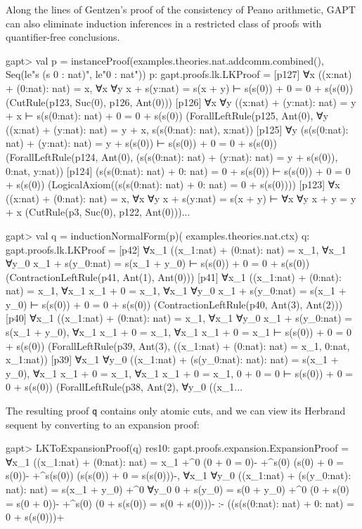 \documentclass[a4paper,11pt]{book}
\begin{document}
Along the lines of Gentzen's proof of the consistency of Peano arithmetic,
GAPT can also eliminate induction inferences in a restricted class of proofs
with quantifier-free conclusions.

\begin{clilisting}
gapt> val p = instanceProof(examples.theories.nat.addcomm.combined(),                                     Seq(le"s (s 0 : nat)", le"0 : nat"))
p: gapt.proofs.lk.LKProof =
[p127] ∀x ((x:nat) + (0:nat): nat) = x,
∀x ∀y x + s(y:nat) = s(x + y)
⊢
s(s(0)) + 0 = 0 + s(s(0))    (CutRule(p123, Suc(0), p126, Ant(0)))
[p126] ∀x ∀y ((x:nat) + (y:nat): nat) = y + x ⊢ s(s(0:nat): nat) + 0 = 0 + s(s(0))    (ForallLeftRule(p125, Ant(0), ∀y ((x:nat) + (y:nat): nat) = y + x, s(s(0:nat): nat), x:nat))
[p125] ∀y (s(s(0:nat): nat) + (y:nat): nat) = y + s(s(0)) ⊢ s(s(0)) + 0 = 0 + s(s(0))    (ForallLeftRule(p124, Ant(0), (s(s(0:nat): nat) + (y:nat): nat) = y + s(s(0)), 0:nat, y:nat))
[p124] (s(s(0:nat): nat) + 0: nat) = 0 + s(s(0)) ⊢ s(s(0)) + 0 = 0 + s(s(0))    (LogicalAxiom((s(s(0:nat): nat) + 0: nat) = 0 + s(s(0))))
[p123] ∀x ((x:nat) + (0:nat): nat) = x,
∀x ∀y x + s(y:nat) = s(x + y)
⊢
∀x ∀y x + y = y + x    (CutRule(p3, Suc(0), p122, Ant(0)))...

gapt> val q = inductionNormalForm(p)(                                         examples.theories.nat.ctx)
q: gapt.proofs.lk.LKProof =
[p42] ∀x_1 ((x_1:nat) + (0:nat): nat) = x_1,
∀x_1 ∀y_0 x_1 + s(y_0:nat) = s(x_1 + y_0)
⊢
s(s(0)) + 0 = 0 + s(s(0))    (ContractionLeftRule(p41, Ant(1), Ant(0)))
[p41] ∀x_1 ((x_1:nat) + (0:nat): nat) = x_1,
∀x_1 x_1 + 0 = x_1,
∀x_1 ∀y_0 x_1 + s(y_0:nat) = s(x_1 + y_0)
⊢
s(s(0)) + 0 = 0 + s(s(0))    (ContractionLeftRule(p40, Ant(3), Ant(2)))
[p40] ∀x_1 ((x_1:nat) + (0:nat): nat) = x_1,
∀x_1 ∀y_0 x_1 + s(y_0:nat) = s(x_1 + y_0),
∀x_1 x_1 + 0 = x_1,
∀x_1 x_1 + 0 = x_1
⊢
s(s(0)) + 0 = 0 + s(s(0))    (ForallLeftRule(p39, Ant(3), ((x_1:nat) + (0:nat): nat) = x_1, 0:nat, x_1:nat))
[p39] ∀x_1 ∀y_0 ((x_1:nat) + (s(y_0:nat): nat): nat) = s(x_1 + y_0),
∀x_1 x_1 + 0 = x_1,
∀x_1 x_1 + 0 = x_1,
0 + 0 = 0
⊢
s(s(0)) + 0 = 0 + s(s(0))    (ForallLeftRule(p38, Ant(2), ∀y_0 ((x_1...

\end{clilisting}

The resulting proof \texttt{q} contains only atomic cuts, and we can view its Herbrand
sequent by converting to an expansion proof:

\begin{clilisting}
gapt> LKToExpansionProof(q)
res10: gapt.proofs.expansion.ExpansionProof =
∀x_1 ((x_1:nat) + (0:nat): nat) = x_1
  +^{0} (0 + 0 = 0)-
  +^{s(0)} (s(0) + 0 = s(0))-
  +^{s(s(0))} (s(s(0)) + 0 = s(s(0)))-,
∀x_1 ∀y_0 ((x_1:nat) + (s(y_0:nat): nat): nat) = s(x_1 + y_0)
  +^{0}
    ∀y_0 0 + s(y_0) = s(0 + y_0)
    +^{0} (0 + s(0) = s(0 + 0))-
    +^{s(0)} (0 + s(s(0)) = s(0 + s(0)))-
:-
((s(s(0:nat): nat) + 0: nat) = 0 + s(s(0)))+

\end{clilisting}
\end{document}
